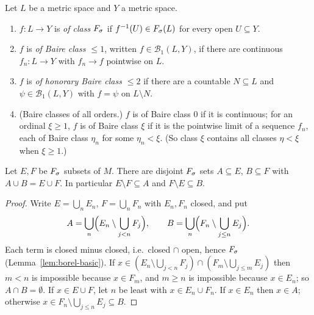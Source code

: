\begin{definition}\label{def:fn-classes}
Let $L$ be a metric space and $Y$ a metric space.
\begin{enumerate}[label=(\alph*)]
\item $f:L\to Y$ is \emph{of class $F_\sigma$} if $f^{-1}(U)\in F_\sigma(L)$ for every open $U\subseteq Y$.
\item $f$ is \emph{of Baire class $\le1$}, written $f\in\mathcal B_1(L,Y)$, if there are continuous
  $f_n:L\to Y$ with $f_n\to f$ pointwise on $L$.
\item $f$ is \emph{of honorary Baire class $\le2$} if there are a countable $N\subseteq L$ and
  $\psi\in\mathcal B_1(L,Y)$ with $f=\psi$ on $L\setminus N$.
\item (Baire classes of all orders.) $f$ is of Baire class $0$ if it is continuous; for an ordinal
  $\xi\ge1$, $f$ is of Baire class $\xi$ if it is the pointwise limit of a sequence $f_n$, each of
  Baire class $\eta_n$ for some $\eta_n<\xi$. (So class $\xi$ contains all classes $\eta<\xi$ when
  $\xi\ge1$.)
\end{enumerate}
\end{definition}

\begin{lemma}\label{lem:reduction}
Let $E,F$ be $F_\sigma$ subsets of $M$. There are disjoint $F_\sigma$ sets $A\subseteq E$, $B\subseteq F$ with
$A\cup B=E\cup F$. In particular $E\setminus F\subseteq A$ and $F\setminus E\subseteq B$.
\end{lemma}
\begin{proof}
Write $E=\bigcup_nE_n$, $F=\bigcup_nF_n$ with $E_n,F_n$ closed, and put
\[
A=\bigcup_n\Bigl(E_n\setminus\bigcup_{j<n}F_j\Bigr),\qquad
B=\bigcup_n\Bigl(F_n\setminus\bigcup_{j\le n}E_j\Bigr).
\]
Each term is closed minus closed, i.e.\ closed $\cap$ open, hence $F_\sigma$ (Lemma~\ref{lem:borel-basic}).
If $x\in(E_n\setminus\bigcup_{j<n}F_j)\cap(F_m\setminus\bigcup_{j\le m}E_j)$ then $m<n$ is impossible
because $x\in F_m$, and $m\ge n$ is impossible because $x\in E_n$; so $A\cap B=\emptyset$. If
$x\in E\cup F$, let $n$ be least with $x\in E_n\cup F_n$. If $x\in E_n$ then $x\in A$; otherwise
$x\in F_n\setminus\bigcup_{j\le n}E_j\subseteq B$.
\end{proof}

